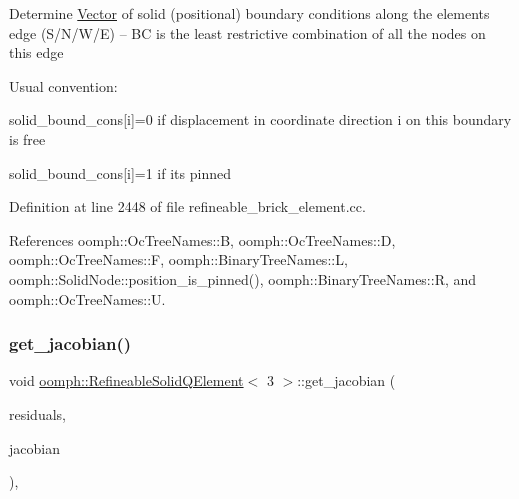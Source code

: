 Determine \hyperlink{classoomph_1_1Vector}{Vector} of solid (positional) boundary conditions along the element\textquotesingle{}s edge (S/\+N/\+W/E) -- BC is the least restrictive combination of all the nodes on this edge

Usual convention\+:
\begin{DoxyItemize}
\item solid\+\_\+bound\+\_\+cons\mbox{[}i\mbox{]}=0 if displacement in coordinate direction i on this boundary is free
\item solid\+\_\+bound\+\_\+cons\mbox{[}i\mbox{]}=1 if it\textquotesingle{}s pinned 
\end{DoxyItemize}

Definition at line 2448 of file refineable\+\_\+brick\+\_\+element.\+cc.



References oomph\+::\+Oc\+Tree\+Names\+::B, oomph\+::\+Oc\+Tree\+Names\+::D, oomph\+::\+Oc\+Tree\+Names\+::F, oomph\+::\+Binary\+Tree\+Names\+::L, oomph\+::\+Solid\+Node\+::position\+\_\+is\+\_\+pinned(), oomph\+::\+Binary\+Tree\+Names\+::R, and oomph\+::\+Oc\+Tree\+Names\+::U.

\mbox{\label{classoomph_1_1RefineableSolidQElement_3_013_01_4_a305f594f84be7336b1bd63bc5c8f2d35}} 
\subsubsection{\texorpdfstring{get\+\_\+jacobian()}{get\_jacobian()}}
{\footnotesize\ttfamily void \hyperlink{classoomph_1_1RefineableSolidQElement}{oomph\+::\+Refineable\+Solid\+Q\+Element}$<$ 3 $>$\+::get\+\_\+jacobian (\begin{DoxyParamCaption}\item[{\hyperlink{classoomph_1_1Vector}{Vector}$<$ double $>$ \&}]{residuals,  }\item[{\hyperlink{classoomph_1_1DenseMatrix}{Dense\+Matrix}$<$ double $>$ \&}]{jacobian }\end{DoxyParamCaption})\hspace{0.3cm}{\ttfamily [inline]}, {\ttfamily [virtual]}}




